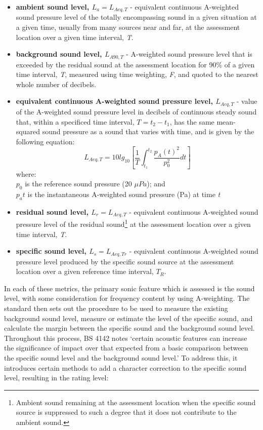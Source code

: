 \begin{itemize}
  \item \textbf{ambient sound level, $L_a = L_{Aeq,T}$} - equivalent continuous A-weighted sound pressure level of the totally encompassing sound in a given situation at a given time, usually from many sources near and far, at the assessment location over a given time interval, \emph{T}.
  \item \textbf{background sound level, $L_{A90,T}$} - A-weighted sound pressure level that is exceeded by the residual sound at the assessment location for 90\% of a given time interval, \emph{T}, measured using time weighting, \emph{F}, and quoted to the nearest whole number of decibels.
  \item \textbf{equivalent continuous A-weighted sound pressure level, $L_{Aeq,T}$} - value of the A-weighted sound pressure level in decibels of continuous steady sound that, within a specificed time interval, $T = t_2 - t_1$, has the same mean-squared sound pressure as a sound that varies with time, and is given by the following equation:
  \begin{equation}
    L_{Aeq,T} = 10 lg_{10} \left[\frac{1}{T} \int^{t_2}_{t_1} \frac{p_A(t)^2}{p_0^2}dt \right]
  \end{equation}
    where: \\
      \space $p_0$ is the reference sound pressure (20 $\mu Pa$); and\\
      \space $p_a{t}$ is the instantaneous A-weighted sound pressure (Pa) at time \emph{t}
  \item \textbf{residual sound level, $L_r=L_{Aeq,T}$} - equivalent continuous A-weighted sound pressure level of the residual sound\footnote{Ambient sound remaining at the assessment location when the specific sound source is suppressed to such a degree that it does not contribute to the ambient sound.} at the assessment location over a given time interval, \emph{T}.
  \item \textbf{specific sound level, $L_s=L_{Aeq,Tr}$} - equivalent continuous A-weighted sound pressure level produced by the specific sound source at the assessment location over a given reference time interval, $T_R$.
\end{itemize}

In each of these metrics, the primary sonic feature which is assessed is the sound level, with some consideration for frequency content by using A-weighting. The standard then sets out the procedure to be used to measure the existing background sound level, measure or estimate the level of the specific sound, and calculate the margin between the specific sound and the background sound level. Throughout this process, BS 4142 notes `certain acoustic features can increase the significance of impact over that expected from a basic comparison between the specific sound level and the background sound level.' To address this, it introduces certain methods to add a character correction to the specific sound level, resulting in the rating level:

